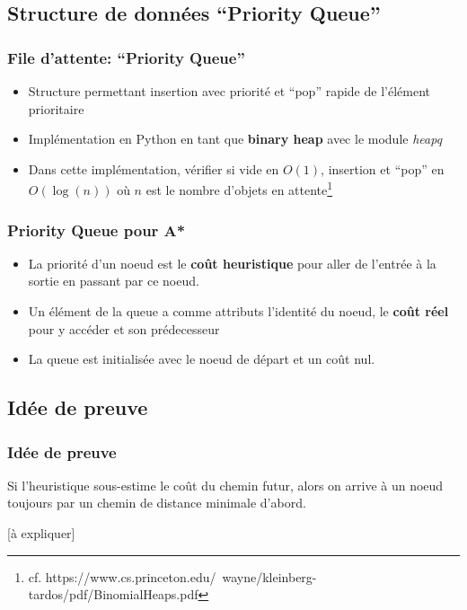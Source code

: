 \documentclass{beamer}
\begin{document}
\subsection{Structure de données ``Priority Queue''}
\begin{frame}
  \frametitle{File d'attente: ``Priority Queue''}
  \begin{itemize}
  \item Structure permettant insertion avec priorité et ``pop'' rapide de
    l'élément prioritaire
  \item Implémentation en Python en tant que \textbf{binary heap} avec le module \textit{heapq}
  \item Dans cette implémentation, vérifier si vide en $O(1)$, insertion et
    ``pop'' en $O\left(\log(n)\right)$ où $n$ est le nombre d'objets en attente\footnote{cf. https://www.cs.princeton.edu/~wayne/kleinberg-tardos/pdf/BinomialHeaps.pdf}
  \end{itemize}
\end{frame}
\begin{frame}
  \frametitle{Priority Queue pour A*}
  \begin{itemize}
  \item<1-> La priorité d'un noeud est le \textbf{coût heuristique} pour aller de
    l'entrée à la sortie en passant par ce noeud.
  \item<2-> Un élément de la queue a comme attributs l'identité du noeud, le
    \textbf{coût réel} pour y accéder et son prédecesseur
  \item<3-> La queue est initialisée avec le noeud de départ et un coût nul.
  \end{itemize}
\end{frame}

\subsection{Idée de preuve}
\begin{frame}
  \frametitle{Idée de preuve}
  Si l'heuristique sous-estime le coût du chemin futur, alors on arrive à un
  noeud toujours par un chemin de distance minimale d'abord.

  [à expliquer]
\end{frame}
\end{document}
